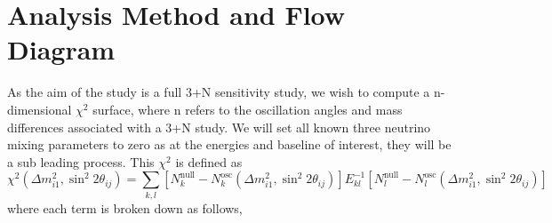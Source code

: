 \documentclass[12pt, a4paper]{article}
\begin{document}
\section{Analysis Method and Flow Diagram}
As the aim of the study is a full 3+N sensitivity study, we wish to compute a n-dimensional $\chi^2$ surface, where n refers to the oscillation angles and mass differences associated with a 3+N study. We will set all known three neutrino mixing parameters to zero as at the energies and baseline of interest, they will be a sub leading process. This $\chi^2$ is defined as 
\[
	\chi^2(\Delta m_{i 1}^2, \sin^2 2 \theta_{ij})=\sum_{k,l} \left[ N^\text{null}_k - N^\text{osc}_k(\Delta m_{i 1}^2, \sin^2 2 \theta_{ij}) \right] E_{kl}^{-1} \left[ N^\text{null}_l - N^\text{osc}_l(\Delta m_{i 1}^2, \sin^2 2 \theta_{ij}) \right]
	\label{eq:chi}
\]
where each term is broken down as follows,
\end{document}
